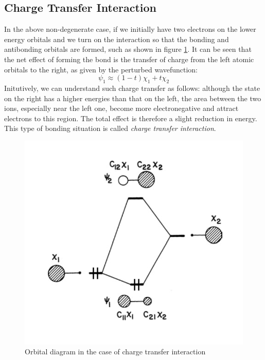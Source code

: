 \documentclass{article}
\begin{document}
\subsection{Charge Transfer Interaction}
In the above non-degenerate case, if we initially have two electrons on 
the lower energy orbitals and we turn on the interaction so that the bonding 
and antibonding orbitals are formed, such as shown in figure \ref{F:charge_transfer}. 
It can be seen that the net effect of forming the bond is the transfer of charge 
from the left atomic orbitals to the right, as given by the perturbed wavefunction:
\begin{equation*}
    \psi_1 \approx (1-t) \chi_1 + t \chi_2
\end{equation*}
Initutively, we can understand such charge transfer as follows: although the 
state on the right has a higher energies than that on the left, the area between 
the two ions, especially near the left one, become more electronegative and attract 
electrons to this region. The total effect is therefore a slight reduction in 
energy. This type of bonding situation is called \emph{charge transfer interaction}.
\begin{figure}[h!]
    \centering
    \includegraphics{F_charge_transfer.png}
    \caption{Orbital diagram in the case of charge transfer interaction}
    \label{F:charge_transfer}
\end{figure}
\end{document}
